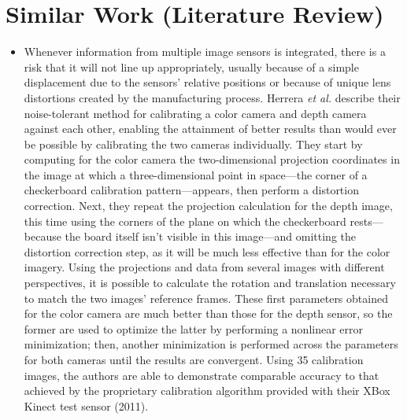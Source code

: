 \documentclass[12pt]{report}
\begin{document}
\section{Similar Work (Literature Review)}
\begin{itemize}
\item{Whenever information from multiple image sensors is integrated, there is a risk that it will not line up appropriately, usually because of a simple displacement due to the sensors' relative positions or because of unique lens distortions created by the manufacturing process.  Herrera \textit{et al.} describe their noise-tolerant method for calibrating a color camera and depth camera against each other, enabling the attainment of better results than would ever be possible by calibrating the two cameras individually.  They start by computing for the color camera the two-dimensional projection coordinates in the image at which a three-dimensional point in space---the corner of a checkerboard calibration pattern---appears, then perform a distortion correction.  Next, they repeat the projection calculation for the depth image, this time using the corners of the plane on which the checkerboard rests---because the board itself isn't visible in this image---and omitting the distortion correction step, as it will be much less effective than for the color imagery.  Using the projections and data from several images with different perspectives, it is possible to calculate the rotation and translation necessary to match the two images' reference frames.  These first parameters obtained for the color camera are much better than those for the depth sensor, so the former are used to optimize the latter by performing a nonlinear error minimization; then, another minimization is performed across the parameters for both cameras until the results are convergent.  Using 35 calibration images, the authors are able to demonstrate comparable accuracy to that achieved by the proprietary calibration algorithm provided with their XBox Kinect test sensor (2011).}

\end{itemize}
\end{document}
